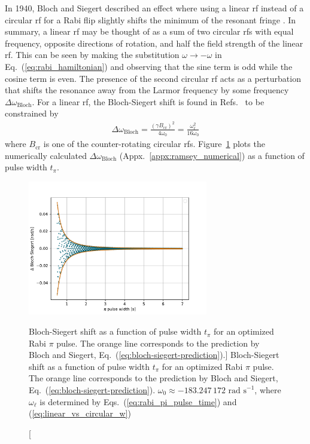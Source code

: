 
In 1940, Bloch and Siegert described an effect where using a linear \acrshort*{rf} instead of a circular \acrshort*{rf} for a Rabi flip slightly shifts the minimum of the resonant fringe \cite{bloch_magnetic_1940}. In summary, a linear \acrshort*{rf} may be thought of as a sum of two circular \acrshort*{rf}s with equal frequency, opposite directions of rotation, and half the field strength of the linear \acrshort*{rf}. This can be seen by making the substitution $\omega \rightarrow -\omega$ in Eq.~(\ref{eq:rabi_hamiltonian}) and observing that the sine term is odd while the cosine term is even. The presence of the second circular \acrshort*{rf} acts as a perturbation that shifts the resonance away from the Larmor frequency by some frequency $\Delta\omega_\text{Bloch}$. For a linear \acrshort*{rf}, the Bloch-Siegert shift is found in Refs.~\cite{bloch_magnetic_1940, ramsey_resonance_1955} to be constrained by
%
\begin{gather}
    \Delta\omega_\text{Bloch}= \frac{(\gamma B_\text{cr})^2}{4\omega_0} = \frac{\omega_\ell^2}{16\omega_0}\label{eq:bloch-siegert-prediction}
\end{gather}
%
where $B_\text{cr}$ is one of the counter-rotating circular \acrshort*{rf}s. Figure~\ref{fig:bloch-siegert-t} plots the numerically calculated $\Delta\omega_\text{Bloch}$ (Appx.~\ref{appx:ramsey_numerical}) as a function of pulse width $t_\pi$.

\begin{figure}
    \centering
    \includegraphics[width=0.7\textwidth]{figures/bloch-siegert-rabi.pdf}
    \caption
    [Bloch-Siegert shift as a function of pulse width $t_\pi$ for an optimized Rabi $\pi$ pulse. The  orange line corresponds to the prediction by Bloch and Siegert, Eq.~(\ref{eq:bloch-siegert-prediction}).]
    {Bloch-Siegert shift as a function of pulse width $t_\pi$ for an optimized Rabi $\pi$ pulse. The  orange line corresponds to the prediction by Bloch and Siegert, Eq.~(\ref{eq:bloch-siegert-prediction}). $\omega_0 \approx -183.247\,172 \text{ rad s}^{-1}$, where $\omega_\ell$ is determined by Eqs.~(\ref{eq:rabi_pi_pulse_time}) and (\ref{eq:linear_vs_circular_w})}
    \label{fig:bloch-siegert-t}
\end{figure}

